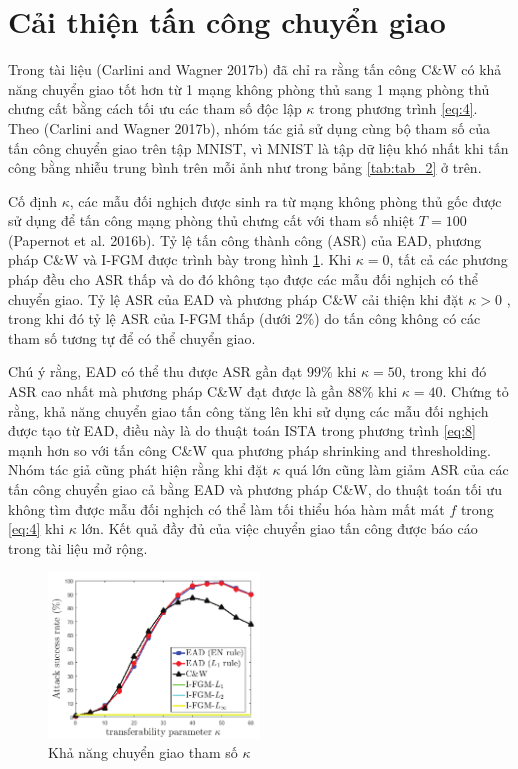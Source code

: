\section{Cải thiện tấn công chuyển giao}
Trong tài liệu (Carlini and Wagner 2017b) đã chỉ ra rằng tấn công C\&W có khả năng chuyển giao tốt hơn  từ 1 mạng không phòng thủ sang 1 mạng phòng thủ chưng cất bằng cách tối ưu các tham số độc lập $\kappa$ trong phương trình \ref{eq:4}. Theo (Carlini and Wagner 2017b), nhóm tác giả sử dụng cùng bộ tham số của tấn công chuyển giao trên tập MNIST, vì MNIST là tập dữ liệu khó nhất khi tấn công bằng nhiễu trung bình trên mỗi ảnh như trong bảng \ref{tab:tab_2} ở trên.

Cố định $\kappa$, các mẫu đối nghịch được sinh ra từ mạng không phòng thủ gốc được sử dụng để tấn công mạng phòng thủ chưng cất với tham số nhiệt $T = 100$ (Papernot et al. 2016b). Tỷ lệ tấn công thành công (ASR) của EAD, phương pháp C\&W và I-FGM được trình bày trong hình \ref{fig:fg_04}. Khi $\kappa = 0$, tất cả các phương pháp đều cho ASR thấp và do đó không tạo được các mẫu đối nghịch có thể chuyển giao. Tỷ lệ ASR của EAD và phương pháp C\&W cải thiện khi đặt $\kappa > 0$ , trong khi đó tỷ lệ ASR của I-FGM thấp (dưới $2\%$) do tấn công không có các tham số tương tự để có thể chuyển giao.

Chú ý rằng, EAD có thể thu được ASR gần đạt $99\%$ khi $\kappa = 50$, trong khi đó ASR cao nhất mà phương pháp C\&W đạt được là gần $88\%$ khi $\kappa = 40$. Chứng tỏ rằng, khả năng chuyển giao tấn công tăng lên khi sử dụng các mẫu đối nghịch được tạo từ EAD, điều này là do thuật toán ISTA trong phương trình \ref{eq:8} mạnh hơn so với tấn công C\&W qua phương pháp shrinking and thresholding. Nhóm tác giả cũng phát hiện rằng khi đặt $\kappa$ quá lớn cũng làm giảm ASR của các tấn công chuyển giao cả bằng EAD và phương pháp C\&W, do thuật toán tối ưu không tìm được mẫu đối nghịch có thể làm tối thiểu hóa hàm mất mát $f$ trong \ref{eq:4} khi $\kappa$ lớn. Kết quả đầy đủ của việc chuyển giao tấn công được báo cáo trong tài liệu mở rộng.

\begin{figure}[H] %
    \centering %
    \includegraphics[width=0.5\textwidth]{assets/fig_04.png} 
    \caption{Khả năng chuyển giao tham số $\kappa$} %
    \label{fig:fg_04}
\end{figure}